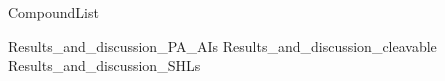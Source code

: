 \documentclass[10pt,a4paper]{article}
\begin{document}

{CompoundList}

\tableofcontents



{Results_and_discussion_PA_AIs}
{Results_and_discussion_cleavable}
{Results_and_discussion_SHLs}
\newpage

\newpage
{}


\listoftodos
\end{document}
